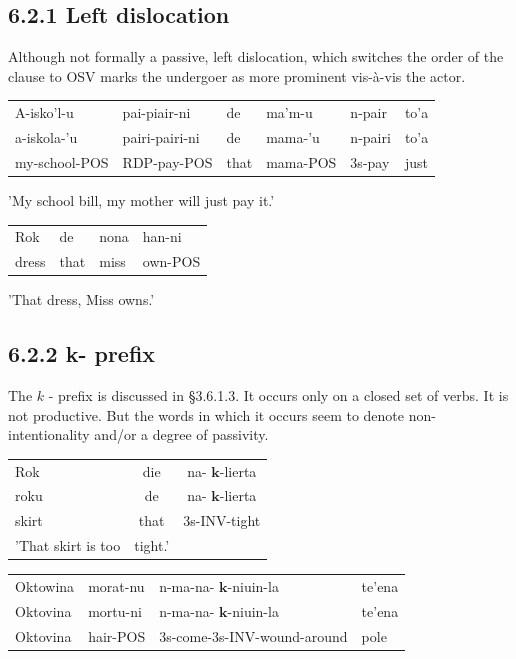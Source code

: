 \documentclass[10pt]{article}
\begin{document}
\subsection*{6.2.1 Left dislocation}
Although not formally a passive, left dislocation, which switches the order of the clause to OSV marks the undergoer as more prominent vis-à-vis the actor.

\begin{center}
\begin{tabular}{llllll}
A-isko'l-u & pai-piair-ni & de & ma'm-u & n-pair & to'a \\
a-iskola-'u & pairi-pairi-ni & de & mama-'u & n-pairi & to'a \\
my-school-POS & RDP-pay-POS & that & mama-POS & 3s-pay & just \\
\end{tabular}
\end{center}

'My school bill, my mother will just pay it.'

\begin{center}
\begin{tabular}{llll}
Rok & de & nona & han-ni \\
dress & that & miss & own-POS \\
\end{tabular}
\end{center}

'That dress, Miss owns.'

\subsection*{6.2.2 k- prefix}
The \(k\) - prefix is discussed in §3.6.1.3. It occurs only on a closed set of verbs. It is not productive. But the words in which it occurs seem to denote non-intentionality and/or a degree of passivity.

\begin{center}
\begin{tabular}{lcc}
Rok & die & na- \(\boldsymbol{k}\)-lierta \\
roku & de & na- \(\boldsymbol{k}\)-lierta \\
skirt & that & 3s-INV-tight \\
'That skirt is too & tight.' &  \\
\end{tabular}
\end{center}

\begin{center}
\begin{tabular}{llll}
Oktowina & morat-nu & n-ma-na- \(\boldsymbol{k}\)-niuin-la & te'ena \\
Oktovina & mortu-ni & n-ma-na- \(\boldsymbol{k}\)-niuin-la & te'ena \\
Oktovina & hair-POS & 3s-come-3s-INV-wound-around & pole \\
\end{tabular}
\end{center}
\end{document}
